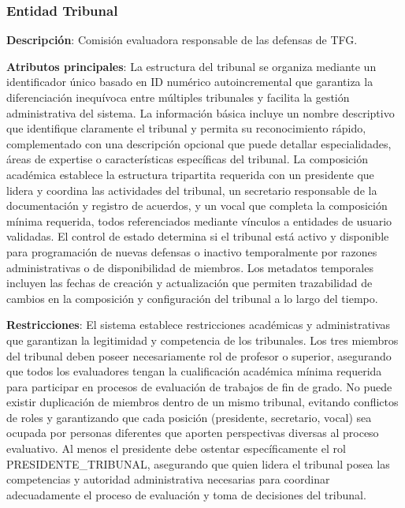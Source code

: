 \documentclass[12pt,a4paper,oneside]{report}
\begin{document}
\subsubsection{Entidad Tribunal}\label{entidad-tribunal}

\textbf{Descripción}: Comisión evaluadora responsable de las defensas de
TFG.

\textbf{Atributos principales}: La estructura del tribunal se organiza mediante un identificador único basado en ID numérico autoincremental que garantiza la diferenciación inequívoca entre múltiples tribunales y facilita la gestión administrativa del sistema. La información básica incluye un nombre descriptivo que identifique claramente el tribunal y permita su reconocimiento rápido, complementado con una descripción opcional que puede detallar especialidades, áreas de expertise o características específicas del tribunal. La composición académica establece la estructura tripartita requerida con un presidente que lidera y coordina las actividades del tribunal, un secretario responsable de la documentación y registro de acuerdos, y un vocal que completa la composición mínima requerida, todos referenciados mediante vínculos a entidades de usuario validadas. El control de estado determina si el tribunal está activo y disponible para programación de nuevas defensas o inactivo temporalmente por razones administrativas o de disponibilidad de miembros. Los metadatos temporales incluyen las fechas de creación y actualización que permiten trazabilidad de cambios en la composición y configuración del tribunal a lo largo del tiempo.

\textbf{Restricciones}: El sistema establece restricciones académicas y administrativas que garantizan la legitimidad y competencia de los tribunales. Los tres miembros del tribunal deben poseer necesariamente rol de profesor o superior, asegurando que todos los evaluadores tengan la cualificación académica mínima requerida para participar en procesos de evaluación de trabajos de fin de grado. No puede existir duplicación de miembros dentro de un mismo tribunal, evitando conflictos de roles y garantizando que cada posición (presidente, secretario, vocal) sea ocupada por personas diferentes que aporten perspectivas diversas al proceso evaluativo. Al menos el presidente debe ostentar específicamente el rol PRESIDENTE_TRIBUNAL, asegurando que quien lidera el tribunal posea las competencias y autoridad administrativa necesarias para coordinar adecuadamente el proceso de evaluación y toma de decisiones del tribunal.
\end{document}
